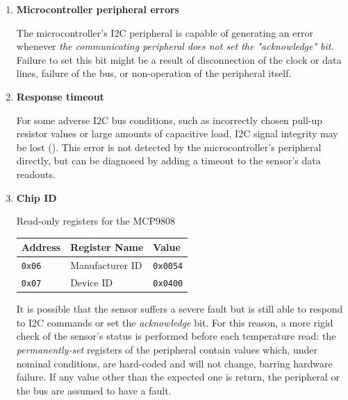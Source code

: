 \documentclass[a4paper,nobib]{tufte-book}
\begin{document}
\begin{enumerate}
	\item \textbf{Microcontroller peripheral errors}
	
	The microcontroller's \ac{I2C} peripheral is capable of generating an error whenever \emph{the communicating peripheral does not set the "acknowledge" bit}. Failure to set this bit might be a result of disconnection of the clock or data lines, failure of the bus, or non-operation of the peripheral itself.
	
	\item \textbf{Response timeout}
	
	For some adverse \ac{I2C} bus conditions, such as incorrectly chosen pull-up resistor values or large amounts of capacitive load, \ac{I2C} signal integrity may be lost (). This error is not detected by the microcontroller's peripheral directly, but can be diagnosed by adding a timeout to the sensor's data readouts.
	
	\item \textbf{Chip ID}
	
	\begin{margintable}
		\centering
		\caption{Read-only registers for the MCP9808}
		\label{tab:mcp9808readonly}
		\begin{tabularx}{\linewidth}{@{}lXl@{}}
			\toprule
			Address & Register Name & Value \\ \midrule
			\texttt{0x06} & Manufacturer ID & \texttt{0x0054} \\
			\texttt{0x07} & Device ID & \texttt{0x0400} \\ \bottomrule
		\end{tabularx}
	\end{margintable}
	
	It is possible that the sensor suffers a severe fault but is still able to respond to \ac{I2C} commands or set the \emph{acknowledge} bit. For this reason, a more rigid check of the sensor's status is performed before each temperature read: the \emph{permanently-set} registers of the peripheral contain values which, under nominal conditions, are hard-coded and will not change, barring hardware failure. If any value other than the expected one is return, the peripheral or the bus are assumed to have a fault.
\end{enumerate}
\end{document}
